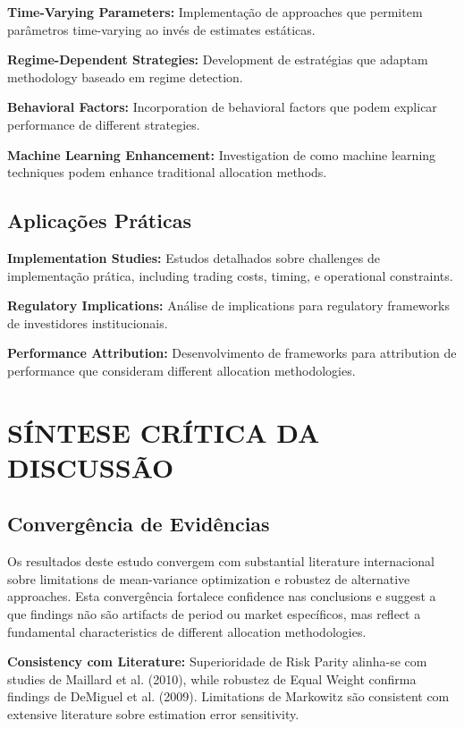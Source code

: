 \textbf{Time-Varying Parameters:} Implementação de approaches que permitem parâmetros time-varying ao invés de estimates estáticas.

\textbf{Regime-Dependent Strategies:} Development de estratégias que adaptam methodology baseado em regime detection.

\textbf{Behavioral Factors:} Incorporation de behavioral factors que podem explicar performance de different strategies.

\textbf{Machine Learning Enhancement:} Investigation de como machine learning techniques podem enhance traditional allocation methods.

\subsection{Aplicações Práticas}

\textbf{Implementation Studies:} Estudos detalhados sobre challenges de implementação prática, including trading costs, timing, e operational constraints.

\textbf{Regulatory Implications:} Análise de implications para regulatory frameworks de investidores institucionais.

\textbf{Performance Attribution:} Desenvolvimento de frameworks para attribution de performance que consideram different allocation methodologies.

\section{SÍNTESE CRÍTICA DA DISCUSSÃO}

\subsection{Convergência de Evidências}

Os resultados deste estudo convergem com substantial literature internacional sobre limitations de mean-variance optimization e robustez de alternative approaches. Esta convergência fortalece confidence nas conclusions e suggest a que findings não são artifacts de period ou market específicos, mas reflect a fundamental characteristics de different allocation methodologies.

\textbf{Consistency com Literature:} Superioridade de Risk Parity alinha-se com studies de Maillard et al. (2010), while robustez de Equal Weight confirma findings de DeMiguel et al. (2009). Limitations de Markowitz são consistent com extensive literature sobre estimation error sensitivity.

